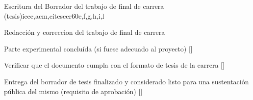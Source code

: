\begin{syllabus}
\begin{unit}{Escritura del Borrador del trabajo de final de carrera (tesis)}{}{ieee,acm,citeseer}{60}{e,f,g,h,i,l}
\begin{topics}
    \item Redacción y correccion del trabajo de final de carrera
\end{topics}

\begin{learningoutcomes}
    \item Parte experimental concluída (si fuese adecuado al proyecto) [\Assessment]
    \item Verificar que el documento cumpla con el formato de tesis de la carrera [\Assessment]
    \item Entrega del borrador de tesis finalizado y considerado listo para una sustentación pública del mismo (requisito de aprobación) [\Assessment]
\end{learningoutcomes}
\end{unit}

\begin{coursebibliography}
\end{coursebibliography}
\end{syllabus}

